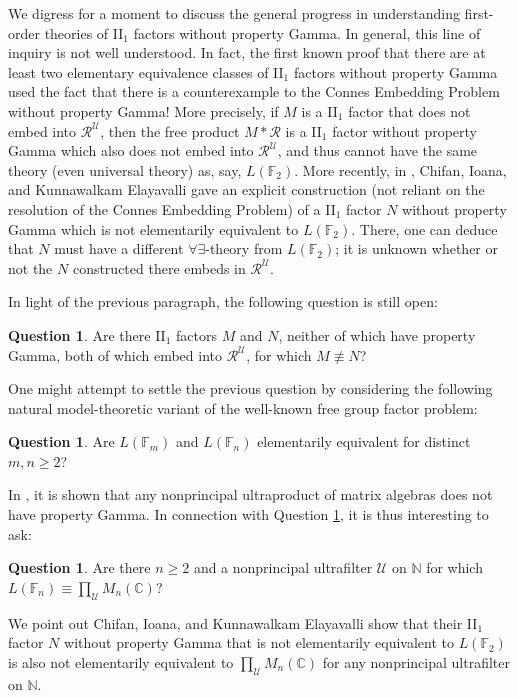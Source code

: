 \documentclass[12pt]{amsart}
\theoremstyle{definition}
\newtheorem{question}[thm]{Question}
\def\bb{\mathbb}
\def\bb{\mathbb}
\def\u{\mathsf 1}
\def \R{\mathcal R}
\def \u{\mathcal U}
\begin{document}
We digress for a moment to discuss the general progress in understanding first-order theories of II$_1$ factors without property Gamma.  In general, this line of inquiry is not well understood.  In fact, the first known proof that there are at least two elementary equivalence classes of II$_1$ factors without property Gamma used the fact that there is a counterexample to the Connes Embedding Problem without property Gamma!  More precisely, if $M$ is a II$_1$ factor that does not embed into $\R^\u$, then the free product $M*\R$ is a II$_1$ factor without property Gamma which also does not embed into $\R^\u$, and thus cannot have the same theory (even universal theory) as, say, $L(\bb F_2)$.  More recently, in \cite{cik}, Chifan, Ioana, and Kunnawalkam Elayavalli gave an explicit construction (not reliant on the resolution of the Connes Embedding Problem) of a II$_1$ factor $N$ without property Gamma which is not elementarily equivalent to $L(\bb F_2)$.  There, one can deduce that $N$ must have a different $\forall\exists$-theory from $L(\bb F_2)$; it is unknown whether or not the $N$ constructed there embeds in $\R^\u$.

In light of the previous paragraph, the following question is still open:

\begin{question}\label{nongammaquestion}
Are there II$_1$ factors $M$ and $N$, neither of which have property Gamma, both of which embed into $\R^\u$, for which $M\not\equiv N$?
\end{question}

One might attempt to settle the previous question by considering the following natural model-theoretic variant of the well-known free group factor problem:

\begin{question}
Are $L(\bb F_m)$ and $L(\bb F_n)$ elementarily equivalent for distinct $m,n\geq 2$?
\end{question}

In \cite[Theorem 5.1]{mtoa3}, it is shown that any nonprincipal ultraproduct of matrix algebras does not have property Gamma.  In connection with Question \ref{nongammaquestion}, it is thus interesting to ask:

\begin{question}
Are there $n\geq 2$ and a nonprincipal ultrafilter $\u$ on $\bb N$ for which $L(\bb F_n)\equiv \prod_\u M_n(\bb C)$?
\end{question}

We point out Chifan, Ioana, and Kunnawalkam Elayavalli show that their II$_1$ factor $N$ without property Gamma that is not elementarily equivalent to $L(\bb F_2)$ is also not elementarily equivalent to $\prod_\u M_n(\bb C)$ for any nonprincipal ultrafilter on $\bb N$. 
\end{document}
